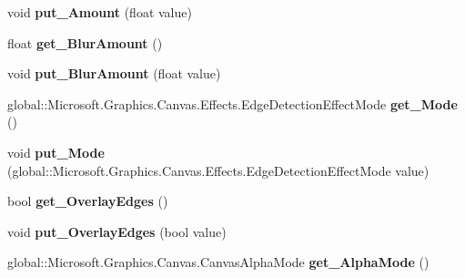 \begin{DoxyCompactItemize}
void {\bfseries put\+\_\+\+Amount} (float value)
\item 
\mbox{\label{class_microsoft_1_1_graphics_1_1_canvas_1_1_effects_1_1_edge_detection_effect_ae48b3056466454ff45406d2d9be05f6b}} 
float {\bfseries get\+\_\+\+Blur\+Amount} ()
\item 
\mbox{\label{class_microsoft_1_1_graphics_1_1_canvas_1_1_effects_1_1_edge_detection_effect_a73881826da0680e80bc3fabfb027cfd7}} 
void {\bfseries put\+\_\+\+Blur\+Amount} (float value)
\item 
\mbox{\label{class_microsoft_1_1_graphics_1_1_canvas_1_1_effects_1_1_edge_detection_effect_a6c501576c1a32800807da3e3b7750015}} 
global\+::\+Microsoft.\+Graphics.\+Canvas.\+Effects.\+Edge\+Detection\+Effect\+Mode {\bfseries get\+\_\+\+Mode} ()
\item 
\mbox{\label{class_microsoft_1_1_graphics_1_1_canvas_1_1_effects_1_1_edge_detection_effect_a6f2ec4b23f0bd052e66ab4f0520145d5}} 
void {\bfseries put\+\_\+\+Mode} (global\+::\+Microsoft.\+Graphics.\+Canvas.\+Effects.\+Edge\+Detection\+Effect\+Mode value)
\item 
\mbox{\label{class_microsoft_1_1_graphics_1_1_canvas_1_1_effects_1_1_edge_detection_effect_a745adc8a87eda5967288647127125b99}} 
bool {\bfseries get\+\_\+\+Overlay\+Edges} ()
\item 
\mbox{\label{class_microsoft_1_1_graphics_1_1_canvas_1_1_effects_1_1_edge_detection_effect_aed02b04299f1e9aaa193a2836da03fb3}} 
void {\bfseries put\+\_\+\+Overlay\+Edges} (bool value)
\item 
\mbox{\label{class_microsoft_1_1_graphics_1_1_canvas_1_1_effects_1_1_edge_detection_effect_a807b89c06507ab3f180bd69e88b0868d}} 
global\+::\+Microsoft.\+Graphics.\+Canvas.\+Canvas\+Alpha\+Mode {\bfseries get\+\_\+\+Alpha\+Mode} ()

\end{DoxyCompactItemize}
